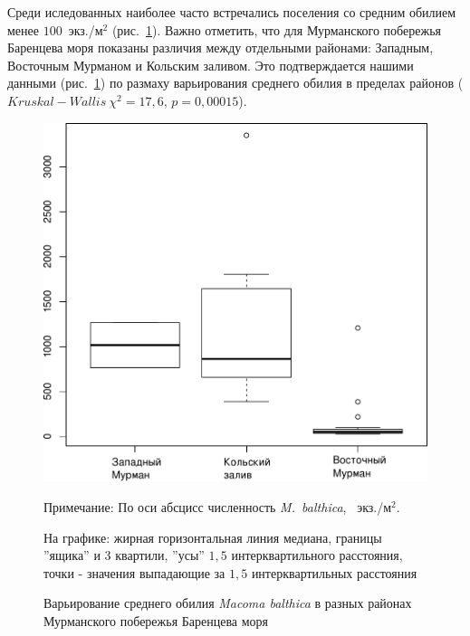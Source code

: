 \documentclass[12pt, a4paper]{disser}
\begin{document}
%
Среди иследованных наиболее часто встречались поселения со средним обилием менее $100$~экз./м$^2$ (рис.~\ref{ris:N_region_Barents}).
Важно отметить, что для Мурманского побережья Баренцева моря показаны различия между отдельными районами: Западным, Восточным Мурманом и Кольским заливом. Это подтверждается нашими данными (рис.~\ref{ris:N_region_Barents}) по размаху варьирования среднего обилия в пределах районов ($Kruskal-Wallis\ \chi^2 = 17,6$, $p = 0,00015$).
	\begin{figure}[h]
		\includegraphics{../All_N/Nmean_region_Barents1.pdf}
	\caption{Варьирование среднего обилия {\it Macoma balthica} в разных районах Мурманского побережья Баренцева моря}
	{\footnotesize Примечание: По оси абсцисс \textemdash численность {\it M.~balthica}, ~экз./м$^2$.

	На графике: жирная горизонтальная линия \textemdash медиана, границы ''ящика''  и 3 квартили, ''усы'' \textemdash $1,5$ интерквартильного расстояния, точки - значения выпадающие за $1,5$ интерквартильных расстояния}
	\label{ris:N_region_Barents}
	\end{figure}



		\subsection{}
\end{document}
